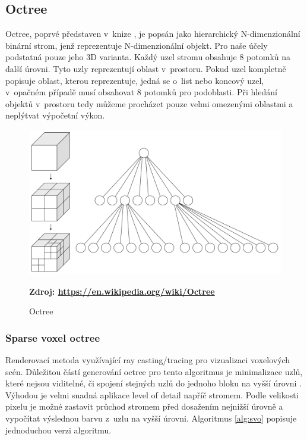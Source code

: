 \subsection{Octree} \label{octree}
Octree, poprvé představen v~knize \cite{rensselaer1980octree}, je popsán jako hierarchický N-dimenzionální binární strom, jenž reprezentuje N-dimenzionální objekt. Pro naše účely podstatná pouze jeho 3D varianta. Každý uzel stromu obsahuje 8 potomků na další úrovni. Tyto uzly reprezentují oblast v~prostoru. Pokud uzel kompletně popisuje oblast, kterou reprezentuje, jedná se o~list nebo koncový uzel, v~opačném případě musí obsahovat 8 potomků pro podoblasti. Při hledání objektů v~prostoru tedy můžeme procházet pouze velmi omezenými oblastmi a neplýtvat výpočetní výkon.

\begin{figure}[H]
	\centering
	\includegraphics[scale=0.1]{obrazky-figures/Octree2.pdf}
	\caption{Octree}
	\textbf{Zdroj: \url{https://en.wikipedia.org/wiki/Octree}}
	\label{fig:slabs}
\end{figure}


\subsubsection{Sparse voxel octree}\label{svo_alg}
Renderovací metoda využívající ray casting/tracing pro vizualizaci voxelových scén. Důležitou částí generování octree pro tento algoritmus je minimalizace uzlů, které nejsou viditelné, či spojení stejných uzlů do jednoho bloku na vyšší úrovni \cite{Laine2011EfficientSV}. Výhodou je velmi snadná aplikace level of detail napříč stromem. Podle velikosti pixelu je možné zastavit průchod stromem před dosažením nejnižší úrovně a vypočítat výslednou barvu z~uzlu na vyšší úrovni. Algoritmus \ref{alg:svo} popisuje jednoduchou verzi algoritmu.

